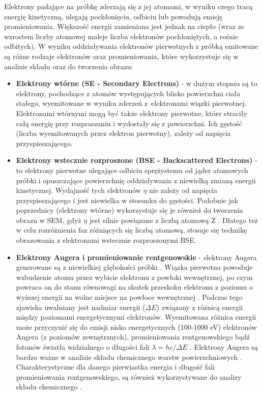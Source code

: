 \documentclass{article}
\begin{document}
\begin{enumerate}
Elektrony padające na próbkę zderzają się z jej atomami, w wyniku czego tracą energię kinetyczną, ulegają pochłonięciu, odbiciu lub powodują emisję promieniowania. Większość energii zamieniana jest jednak na ciepło (wraz ze wzrostem liczby atomowej maleje liczba elektronów pochłoniętych, a rośnie odbitych). W wyniku oddziaływania elektronów pierwotnych z próbką emitowane są różne rodzaje elektronów oraz promieniowania, które wykorzystuje się w analizie składu oraz do tworzenia obrazu:
\begin{itemize}
\item {\bf Elektrony wtórne (SE - Secondary Electrons)} - w dużym stopniu są to elektrony, pochodzące z atomów występujących blisko powierzchni ciała stałego, wyemitowane w wyniku zderzeń z~elektronami wiązki pierwotnej. Elektronami wtórnymi mogą być także elektrony pierwotne, które straciły całą energię przy rozpraszaniu i wydostały się z powierzchni. Ich gęstość  (liczba wyemitowanych przez elektron pierwotny), zależy od napięcia przyspieszającego.
\item {\bf Elektrony wstecznie rozproszone (BSE - Backscattered Electrons)} - to elektrony pierwotne ulegające odbiciu sprężystemu od jąder atomowych próbki i opuszczające powierzchnię oddziaływania z niewielką zmianą energii kinetycznej. Wydajność tych elektronów $\eta$ nie zależy od napięcia przyspieszającego i jest niewielka w stosunku do gęstości. Podobnie jak poprzednicy (elektrony wtórne) wykorzystuje się je również do tworzenia obrazu w SEM, gdyż $\eta$ jest silnie powiązane z liczbą atomową Z . Dlatego też w celu rozróżnienia faz różniących się liczbą atomową, stosuje się technikę obrazowania z elektronami wstecznie rozproszonymi BSE.

\item {\bf Elektrony Augera i promieniowanie rentgenowskie} - elektrony Augera generowane są z niewielkiej głębokości próbki . Wiązka pierwotna powoduje wzbudzenie atomu przez wybicie elektronu z powłoki wewnętrznej, po czym powraca on do stanu równowagi na skutek przeskoku elektronu z poziomu o wyższej energii na wolne miejsce na powłoce wewnętrznej . Podczas tego zjawiska uwalniany jest nadmiar energii ($\Delta E$) związany z różnicą energii między poziomami energetycznymi elektronów. Wyemitowana różnica energii może przyczynić się do emisji nisko energetycznych (100-1000 eV) elektronów Augera (z poziomów zewnętrznych), promieniowania rentgenowskiego  bądź fotonów światła widzialnego o długości fali $\lambda = hc/\Delta E$ . Elektrony Augera są bardzo ważne w analizie składu chemicznego warstw powierzchniowych . Charakterystyczne dla danego pierwiastka energia i długość fali promieniowania rentgenowskiego, są również wykorzystywane do analizy składu chemicznego .
\end{itemize}


\end{enumerate}
\end{document}
